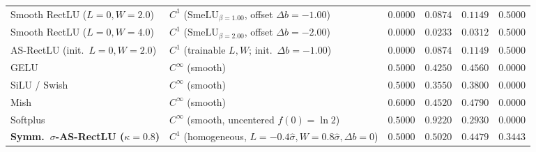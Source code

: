 \documentclass[10pt,a4paper]{article}
\begin{document}
\begin{table}[t]
\begin{tabular}{llcccc}
Smooth RectLU ($L=0, W=2.0$) & $C^1$ ($\text{SmeLU}_{\beta=1.00}$, offset $\Delta b = -1.00$) & $0.0000$ & $0.0874$ & $0.1149$ & $0.5000$ \\
Smooth RectLU ($L=0, W=4.0$) & $C^1$ ($\text{SmeLU}_{\beta=2.00}$, offset $\Delta b = -2.00$) & $0.0000$ & $0.0233$ & $0.0312$ & $0.5000$ \\
AS-RectLU (init.\ $L=0, W=2.0$) & $C^1$ (trainable $L,W$; init.\ $\Delta b = -1.00$) & $0.0000$ & $0.0874$ & $0.1149$ & $0.5000$ \\
GELU & $C^\infty$ (smooth) & $0.5000$ & $0.4250$ & $0.4560$ & $0.0000$ \\
SiLU / Swish & $C^\infty$ (smooth) & $0.5000$ & $0.3550$ & $0.3800$ & $0.0000$ \\
Mish & $C^\infty$ (smooth) & $0.6000$ & $0.4520$ & $0.4790$ & $0.0000$ \\
Softplus & $C^\infty$ (smooth, uncentered $f(0)=\ln 2$) & $0.5000$ & $0.9220$ & $0.2930$ & $0.0000$ \\
\textbf{Symm.\ $\sigma$-AS-RectLU ($\kappa=0.8$)} & $C^1$ (homogeneous, $L=-0.4\hat{\sigma}, W=0.8\hat{\sigma}, \Delta b=0$) & $\mathbf{0.5000}$ & $\mathbf{0.5020}$ & $\mathbf{0.4479}$ & $\mathbf{0.3443}$ \\
\bottomrule
\end{tabular}
\end{table}
\end{document}
